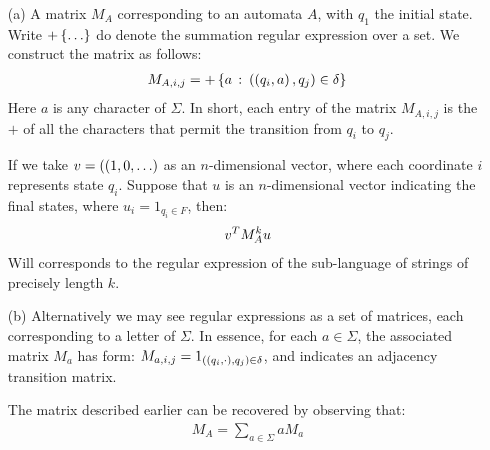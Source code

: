 \begin{enumerate}
    \begin{enumerate}
      \item[(a)]
        A matrix \(M_A\) corresponding to an automata \(A\),
        with \(q_1\) the initial state.
        Write \(+\left\{\ldots\right\}\) do denote
        the summation regular expression over a set.
        We construct the matrix as follows:
        \begin{align*}
          M_{A, i, j} =
            + \left\{a \ \colon \left(\left(q_i, a\right), q_j\right) \in \delta\right\}
        \end{align*}
        Here \(a\) is any character of \(\Sigma\).
        In short, each entry of the matrix \(M_{A, i, j}\)
        is the \(+\) of all the characters
        that permit the transition from \(q_i\) to \(q_j\).

        If we take \(v = (\left(1, 0, \ldots\right)\) as an \(n\)-dimensional
        vector, where each coordinate \(i\) represents state \(q_i\).
        Suppose that \(u\) is an \(n\)-dimensional vector indicating
        the final states,
        where \(u_i = 1_{q_i \in F}\), then:
        \begin{align*}
          {v}^{T} M_A ^k u
        \end{align*}
        Will corresponds to the regular expression of the sub-language
        of strings of precisely length \(k\).

      \item[(b)]
        Alternatively we may see regular expressions as a
        set of matrices, each corresponding to a letter of \(\Sigma\).
        In essence, for each \(a \in \Sigma\), the associated
        matrix \(M_a\) has form:
        \(M_{a, i, j} = 1_{\left(\left(q_i, \cdot\right), q_j\right) \in \delta}\),
        and indicates an adjacency transition matrix.

        The matrix described earlier can be recovered by observing that:
        \begin{align*}
          M_{A} = \sum_{a \in \Sigma} a M_{a}
        \end{align*}

    \end{enumerate}

\end{enumerate}


